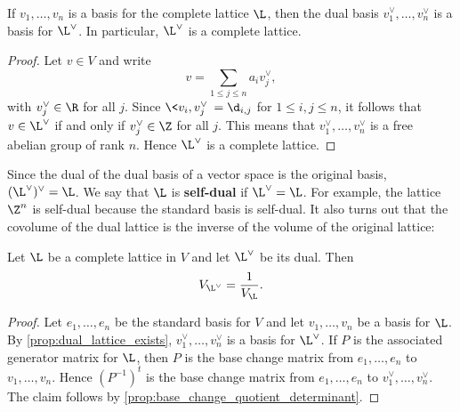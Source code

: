     \begin{proposition}\label{prop:dual_lattice_exists}
      If $v_{1},\ldots,v_{n}$ is a basis for the complete lattice $\L$, then the dual basis $v_{1}^{\vee},\ldots,v_{n}^{\vee}$ is a basis for $\L^{\vee}$. In particular, $\L^{\vee}$ is a complete lattice.
    \end{proposition}
    \begin{proof}
      Let $v \in V$ and write
      \[
        v = \sum_{1 \le j \le n}a_{i}v_{j}^{\vee},
      \]
      with $v_{j}^{\vee} \in \R$ for all $j$. Since $\<v_{i},v_{j}^{\vee}\> = \d_{i,j}$ for $1 \le i,j \le n$, it follows that $v \in \L^{\vee}$ if and only if $v_{j}^{\vee} \in \Z$ for all $j$. This means that $v_{1}^{\vee},\ldots,v_{n}^{\vee}$ is a free abelian group of rank $n$. Hence $\L^{\vee}$ is a complete lattice.
    \end{proof}

    Since the dual of the dual basis of a vector space is the original basis, $(\L^{\vee})^{\vee} = \L$. We say that $\L$ is \textbf{self-dual} if $\L^{\vee} = \L$. For example, the lattice $\Z^{n}$ is self-dual because the standard basis is self-dual. It also turns out that the covolume of the dual lattice is the inverse of the volume of the original lattice:

    \begin{proposition}\label{prop:covolume_of_dual_is_inverse}
      Let $\L$ be a complete lattice in $V$ and let $\L^{\vee}$ be its dual. Then
      \[
        V_{\L^{\vee}} = \frac{1}{V_{\L}}.
      \]
    \end{proposition}
    \begin{proof}
      Let $e_{1},\ldots,e_{n}$ be the standard basis for $V$ and let $v_{1},\ldots,v_{n}$ be a basis for $\L$. By \cref{prop:dual_lattice_exists}, $v_{1}^{\vee},\ldots,v_{n}^{\vee}$ is a basis for $\L^{\vee}$. If $P$ is the associated generator matrix for $\L$, then $P$ is the base change matrix from $e_{1},\ldots,e_{n}$ to $v_{1},\ldots,v_{n}$. Hence $(P^{-1})^{t}$ is the base change matrix from $e_{1},\ldots,e_{n}$ to $v_{1}^{\vee},\ldots,v_{n}^{\vee}$. The claim follows by \cref{prop:base_change_quotient_determinant}.
    \end{proof}
    
